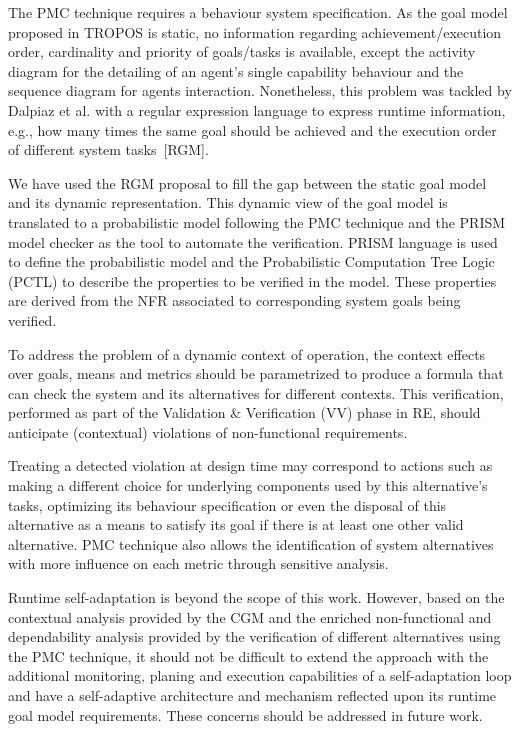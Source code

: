 The PMC technique requires a behaviour system specification. As the goal model proposed in TROPOS is static, no information regarding achievement/execution order, cardinality and priority of goals/tasks is available, except the activity diagram for the detailing of an agent's single capability behaviour and the sequence diagram for agents interaction. Nonetheless, this problem was tackled by Dalpiaz et al. with a regular expression language to express runtime information, e.g., how many times the same goal should be achieved and the execution order of different system tasks~[RGM]. 

We have used the RGM proposal to fill the gap between the static goal model and its dynamic representation. This dynamic view of the goal model is translated to a probabilistic model following the PMC technique and the PRISM model checker as the tool to automate the verification. PRISM language is used to define the probabilistic model and the Probabilistic Computation Tree Logic (PCTL) to describe the properties to be verified in the model. These properties are derived from the NFR associated to corresponding system goals being verified.

To address the problem of a dynamic context of operation, the context effects over goals, means and metrics should be parametrized to produce a formula that can check the system and its alternatives for different contexts. This verification, performed as part of the Validation \& Verification (VV) phase in RE, should anticipate (contextual) violations of non-functional requirements. 

Treating a detected violation at design time may correspond to actions such as making a different choice for underlying components used by this alternative's tasks, optimizing its behaviour specification or even the disposal of this alternative as a means to satisfy its goal if there is at least one other valid alternative. PMC technique also allows the identification of system alternatives with more influence on each metric through sensitive analysis. 

Runtime self-adaptation is beyond the scope of this work. However, based on the contextual analysis provided by the CGM and the enriched non-functional and dependability analysis provided by the verification of different alternatives using the PMC technique, it should not be difficult to extend the approach with the additional monitoring, planing and execution capabilities of a self-adaptation loop and have a self-adaptive architecture and mechanism reflected upon its runtime goal model requirements. These concerns should be addressed in future work.

